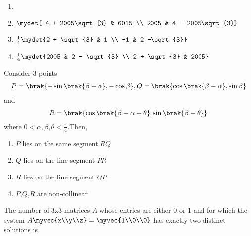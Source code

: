             \begin{enumerate}
                \item {}
                \item $\mydet{ 4 + 2005\sqrt{3} & 6015 \\ 2005 & 4 - 2005\sqrt{3}}$
                \item $\frac{1}{4}\mydet{2 + \sqrt{3} & 1 \\ -1 & 2 -\sqrt{3}}$
                \item $\frac{1}{4}\mydet{2005 & 2 - \sqrt{3} \\ 2 + \sqrt{3} & 2005}$
            \end{enumerate}		
        \item Consider 3 points 
            \begin{align*}
                P=\brak{-\sin \brak{\beta - \alpha}, - \cos\beta}, Q = \brak{\cos \brak{\beta - \alpha}, \sin\beta}
            \end{align*} and 
            \begin{align*} R = \brak{\cos \brak{\beta - \alpha + \theta}, \sin\brak{\beta - \theta}} \end{align*} where $0<\alpha,\beta,\theta<\frac{\pi}{4}.$Then, \hfill{}
                \begin{enumerate}
                    \item $P$ lies on the same segment $RQ$
                    \item $Q$ lies on the line segment $PR$
                    \item $R$ lies on the line segment $QP$
                    \item $P$,$Q$,$R$ are non-collinear
                \end{enumerate}
            \item The number of 3x3 matrices $A$ whose entries are either $0$ or $1$ and for which the system $A\myvec{x\\y\\z}=\myvec{1\\0\\0}$ has exactly two distinct solutions is \hfill{}

